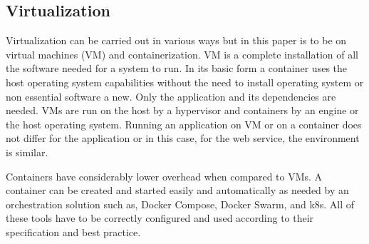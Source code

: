 \subsection{Virtualization}
\begin{sloppypar}
    Virtualization can be carried out in various ways but in this paper is to be
    on virtual machines (VM) and containerization. VM is a complete installation
    of all the software needed for a system to run. In its basic form a
    container uses the host operating system capabilities without the need to
    install operating system or non essential software a new. Only the
    application and its dependencies are needed. VMs are run on the host by a
    hypervisor and containers by an engine or the host operating system. Running
    an application on VM or on a container does not differ for the application
    or in this case, for the web service, the environment is similar.
\end{sloppypar}
\begin{sloppypar}
    Containers have considerably lower overhead when compared to VMs. A
    container can be created and started easily and automatically as needed by
    an orchestration solution such as, Docker Compose, Docker Swarm, and k8s.
    All of these tools have to be correctly configured and used according to
    their specification and best practice.
\end{sloppypar}

